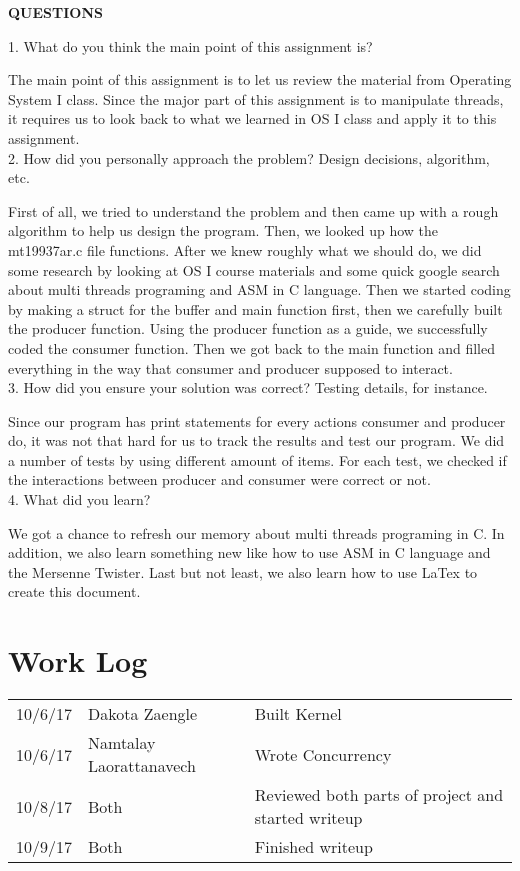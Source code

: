 \documentclass[letterpaper,10pt]{article}
\begin{document}
\textbf{QUESTIONS}

1.	What do you think the main point of this assignment is?

The main point of this assignment is to let us review the material from Operating System I class. Since the major part of this assignment is to manipulate threads, it requires us to look back to what we learned in OS I class and apply it to this assignment.\\

2.	How did you personally approach the problem? Design decisions, algorithm, etc.

First of all, we tried to understand the problem and then came up with a rough algorithm to help us design the program. Then, we looked up how the mt19937ar.c file functions. After we knew roughly what we should do, we did some research by looking at OS I course materials and some quick google search about multi threads programing and ASM in C language.  Then we started coding by making a struct for the buffer and main function first, then we carefully built the producer function. Using the producer function as a guide, we successfully coded the consumer function. Then we got back to the main function and filled everything in the way that consumer and producer supposed to interact.\\

3.	How did you ensure your solution was correct? Testing details, for instance.

Since our program has print statements for every actions consumer and producer do, it was not that hard for us to track the results and test our program. We did a number of tests by using different amount of items. For each test, we checked if the interactions between producer and consumer were correct or not.\\

4.	What did you learn?

We got a chance to refresh our memory about multi threads programing in C. In addition, we also learn something new like how to use ASM in C language and the Mersenne Twister. Last but not least, we also learn how to use LaTex to create this document.\\

\newpage

\section*{Work Log}
\begin{tabular}{l|l|l}
10/6/17 & Dakota Zaengle & Built Kernel \\
10/6/17 & Namtalay Laorattanavech & Wrote Concurrency \\
10/8/17 & Both & Reviewed both parts of project and started writeup \\
10/9/17 & Both & Finished writeup \\
\end{tabular}
\end{document}
